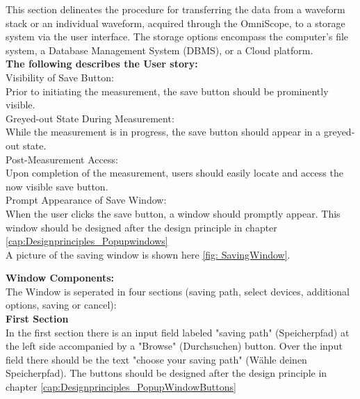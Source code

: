 \documentclass[]{scrreprt}
\begin{document}
This section delineates the procedure for transferring the data from a waveform stack or an individual waveform, acquired through the OmniScope, to a storage system via the user interface. The storage options encompass the computer's file system, a Database Management System (DBMS), or a Cloud platform.
\\

\textbf{The following describes the User story:} \\

Visibility of Save Button: \\

Prior to initiating the measurement, the save button should be prominently visible.\\

Greyed-out State During Measurement:\\

While the measurement is in progress, the save button should appear in a greyed-out state.\\

Post-Measurement Access:\\

Upon completion of the measurement, users should easily locate and access the now visible save button.\\

Prompt Appearance of Save Window:\\

When the user clicks the save button, a window should promptly appear. This window should be designed after the design principle in chapter \ref{cap:Designprinciples_Popupwindows}\\
A picture of the saving window is shown here \ref{fig: SavingWindow}.

\textbf{Window Components:}\\

The Window is seperated in four sections (saving path, select devices, additional options, saving or cancel): \\

\textbf{First Section}\\

In the first section there is an input field labeled "saving path" (Speicherpfad) at the left side accompanied by a "Browse" (Durchsuchen) button. Over the input field there should be the text "choose your saving path" (Wähle deinen Speicherpfad).  The buttons should be designed after the design principle in chapter \ref{cap:Designprinciples_PopupWindowButtons}\\
\end{document}
